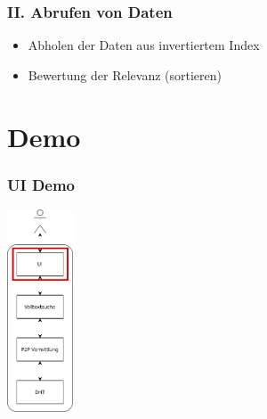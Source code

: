 \documentclass{beamer}
\begin{document}
\begin{frame}
  \frametitle{II. Abrufen von Daten}

  \begin{itemize}
    \item Abholen der Daten aus invertiertem Index
    \item Bewertung der Relevanz (sortieren)
  \end{itemize}
\end{frame}

\section{Demo}
\begin{frame}
  \frametitle{UI Demo}

  \begin{center}
    \includegraphics[height=6cm]{Schichten-alt-ui}
  \end{center}
\end{frame}
\end{document}
